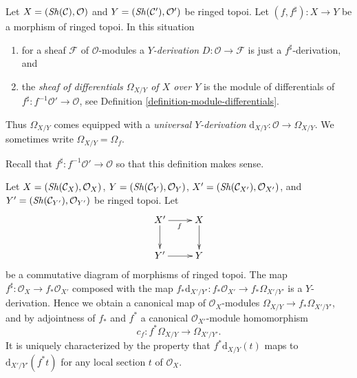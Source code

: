 \begin{definition}
\label{definition-sheaf-differentials}
Let $X = (\mathop{\mathit{Sh}}\nolimits(\mathcal{C}), \mathcal{O})$ and
$Y = (\mathop{\mathit{Sh}}\nolimits(\mathcal{C}'), \mathcal{O}')$ be ringed topoi.
Let $(f, f^\sharp) : X \to Y$ be a morphism of ringed topoi.
In this situation
\begin{enumerate}
\item for a sheaf $\mathcal{F}$ of $\mathcal{O}$-modules a
{\it $Y$-derivation} $D : \mathcal{O} \to \mathcal{F}$ is just a
$f^\sharp$-derivation, and
\item the {\it sheaf of differentials $\Omega_{X/Y}$ of $X$ over $Y$}
is the module of differentials of
$f^\sharp : f^{-1}\mathcal{O}' \to \mathcal{O}$,
see Definition \ref{definition-module-differentials}.
\end{enumerate}
Thus $\Omega_{X/Y}$ comes equipped with a {\it universal $Y$-derivation}
$\text{d}_{X/Y} : \mathcal{O} \longrightarrow \Omega_{X/Y}$. We sometimes
write $\Omega_{X/Y} = \Omega_f$.
\end{definition}

\noindent
Recall that $f^\sharp : f^{-1}\mathcal{O}' \to \mathcal{O}$ so that
this definition makes sense.

\begin{lemma}
\label{lemma-functoriality-differentials-ringed-topoi}
Let
$X = (\mathop{\mathit{Sh}}\nolimits(\mathcal{C}_X), \mathcal{O}_X)$,
$Y = (\mathop{\mathit{Sh}}\nolimits(\mathcal{C}_Y), \mathcal{O}_Y)$,
$X' = (\mathop{\mathit{Sh}}\nolimits(\mathcal{C}_{X'}), \mathcal{O}_{X'})$, and
$Y' = (\mathop{\mathit{Sh}}\nolimits(\mathcal{C}_{Y'}), \mathcal{O}_{Y'})$ be ringed topoi.
Let
$$
\xymatrix{
X' \ar[d] \ar[r]_f & X \ar[d] \\
Y' \ar[r] & Y
}
$$
be a commutative diagram of morphisms of ringed topoi. The map
$f^\sharp : \mathcal{O}_X \to f_*\mathcal{O}_{X'}$ composed with the map
$f_*\text{d}_{X'/Y'} : f_*\mathcal{O}_{X'} \to f_*\Omega_{X'/Y'}$ is a
$Y$-derivation. Hence we obtain a canonical map of $\mathcal{O}_X$-modules
$\Omega_{X/Y} \to f_*\Omega_{X'/Y'}$, and by
adjointness of $f_*$ and $f^*$ a
canonical $\mathcal{O}_{X'}$-module homomorphism
$$
c_f : f^*\Omega_{X/Y} \longrightarrow \Omega_{X'/Y'}.
$$
It is uniquely characterized by the property that
$f^*\text{d}_{X/Y}(t)$ maps to $\text{d}_{X'/Y'}(f^* t)$
for any local section $t$ of $\mathcal{O}_X$.
\end{lemma}

